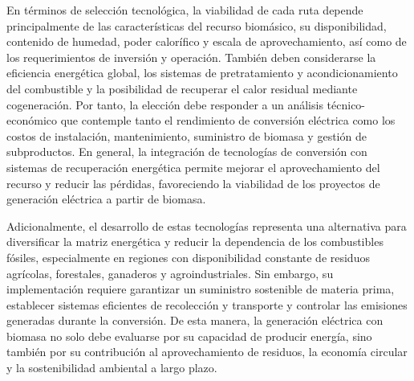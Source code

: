 En términos de selección tecnológica, la viabilidad de cada ruta depende principalmente de las características del recurso biomásico, su disponibilidad, contenido de humedad, poder calorífico y escala de aprovechamiento, así como de los requerimientos de inversión y operación. También deben considerarse la eficiencia energética global, los sistemas de pretratamiento y acondicionamiento del combustible y la posibilidad de recuperar el calor residual mediante cogeneración. Por tanto, la elección debe responder a un análisis técnico-económico que contemple tanto el rendimiento de conversión eléctrica como los costos de instalación, mantenimiento, suministro de biomasa y gestión de subproductos. En general, la integración de tecnologías de conversión con sistemas de recuperación energética permite mejorar el aprovechamiento del recurso y reducir las pérdidas, favoreciendo la viabilidad de los proyectos de generación eléctrica a partir de biomasa.

Adicionalmente, el desarrollo de estas tecnologías representa una alternativa para diversificar la matriz energética y reducir la dependencia de los combustibles fósiles, especialmente en regiones con disponibilidad constante de residuos agrícolas, forestales, ganaderos y agroindustriales. Sin embargo, su implementación requiere garantizar un suministro sostenible de materia prima, establecer sistemas eficientes de recolección y transporte y controlar las emisiones generadas durante la conversión. De esta manera, la generación eléctrica con biomasa no solo debe evaluarse por su capacidad de producir energía, sino también por su contribución al aprovechamiento de residuos, la economía circular y la sostenibilidad ambiental a largo plazo.
